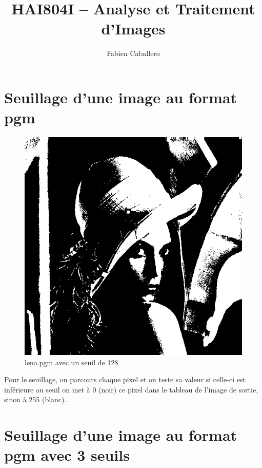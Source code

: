 \documentclass{article}
\title{HAI804I – Analyse et Traitement d'Images}
\author{Fabien Caballero }
\begin{document}
\maketitle
    \tableofcontents

\newpage
\section{Seuillage d'une image au format pgm}



\begin{figure}[h]
\centerline{\includegraphics[scale=0.3]{./rendus/lena1Seuil.png}}
\caption{lena.pgm avec un seuil de 128}
\end{figure}

Pour le seuillage, on parcours chaque pixel et on teste sa valeur si celle-ci est inférieure au seuil on met à 0 (noir) ce pixel dans le tableau de l'image de sortie, sinon à 255 (blanc).

\section{Seuillage d'une image au format pgm avec 3 seuils }
\end{document}
